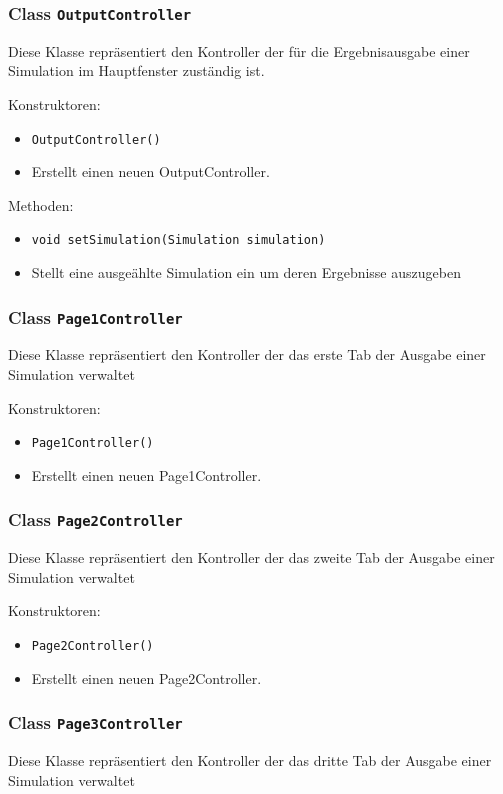 \documentclass[parskip=full,11pt]{scrartcl}
\begin{document}
\subsubsection{Class \texttt{OutputController}}
Diese Klasse repräsentiert den Kontroller der für die Ergebnisausgabe einer Simulation im Hauptfenster zuständig ist.

Konstruktoren:
\begin{itemize}\itemsep -10pt
\item \texttt{OutputController()}
\item[] Erstellt einen neuen OutputController.
\end{itemize}

Methoden:
\begin{itemize}\itemsep -10pt
\item \texttt{void setSimulation(Simulation simulation)}
\item[] Stellt eine ausgeählte Simulation ein um deren Ergebnisse auszugeben
\end{itemize}

\subsubsection{Class \texttt{Page1Controller}}
Diese Klasse repräsentiert den Kontroller der das erste Tab der Ausgabe einer Simulation verwaltet

Konstruktoren:
\begin{itemize}\itemsep -10pt
\item \texttt{Page1Controller()}
\item[] Erstellt einen neuen  Page1Controller.
\end{itemize}

\subsubsection{Class \texttt{Page2Controller}}
Diese Klasse repräsentiert den Kontroller der das zweite Tab der Ausgabe einer Simulation verwaltet

Konstruktoren:
\begin{itemize}\itemsep -10pt
\item \texttt{Page2Controller()}
\item[] Erstellt einen neuen Page2Controller.
\end{itemize}

\subsubsection{Class \texttt{Page3Controller}}
Diese Klasse repräsentiert den Kontroller der das dritte Tab der Ausgabe einer Simulation verwaltet
\end{document}
